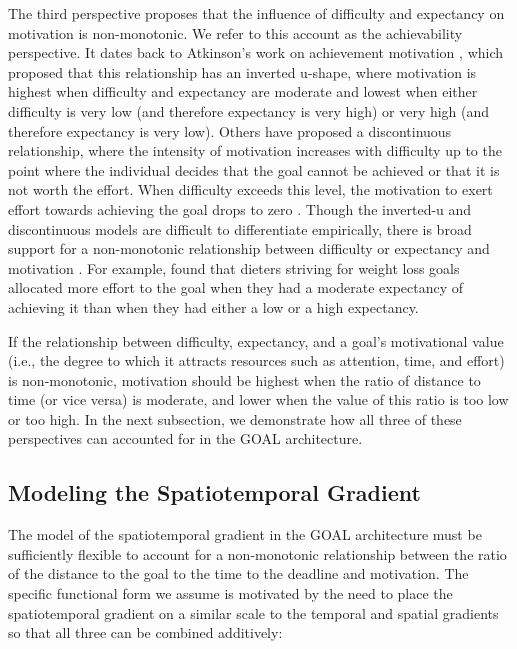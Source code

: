 \documentclass[a4paper,doc,natbib,donotrepeattitle]{apa6}
\begin{document}
The third perspective proposes that the influence of difficulty and expectancy on motivation is non-monotonic. We refer to this account as the achievability perspective. It dates back to Atkinson's work on achievement motivation \citep[e.g.,][]{Atkinson1970}, which proposed that this relationship has an inverted u-shape, where motivation is highest when difficulty and expectancy are moderate and lowest when either difficulty is very low (and therefore expectancy is very high) or very high (and therefore expectancy is very low). Others have proposed a discontinuous relationship, where the intensity of motivation increases with difficulty up to the point where the individual decides that the goal cannot be achieved or that it is not worth the effort. When difficulty exceeds this level, the motivation to exert effort towards achieving the goal drops to zero \citep{Brehm1989,Kukla1972,Kruschke2012,Wright2008}. Though the inverted-u and discontinuous models are difficult to differentiate empirically, there is broad support for a non-monotonic relationship between difficulty or expectancy and motivation \citep[e.g.,][]{Wright1986,Karabenick1968,Biner1987,Brehm1983,Vancouver2008}. For example, \cite{Louro2007} found that dieters striving for weight loss goals allocated more effort to the goal when they had a moderate expectancy of achieving it than when they had either a low or a high expectancy.

If the relationship between difficulty, expectancy, and a goal's motivational value (i.e., the degree to which it attracts resources such as attention, time, and effort) is non-monotonic, motivation should be highest when the ratio of distance to time (or vice versa) is moderate, and lower when the value of this ratio is too low or too high. In the next subsection, we demonstrate how all three of these perspectives can accounted for in the GOAL architecture.

\subsection{Modeling the Spatiotemporal Gradient}

The model of the spatiotemporal gradient in the GOAL architecture must be sufficiently flexible to account for a non-monotonic relationship between the ratio of the distance to the goal to the time to the deadline and motivation. The specific functional form we assume is motivated by the need to place the spatiotemporal gradient on a similar scale to the temporal and spatial gradients so that all three can be combined additively:
\end{document}
